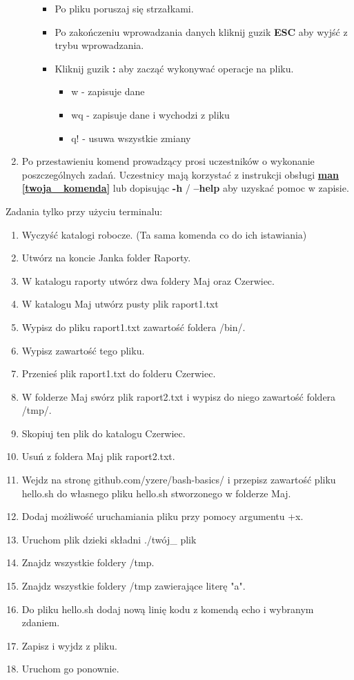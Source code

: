 \documentclass[10pt,a4paper]{article}
\begin{document}
\begin{enumerate}
\begin{itemize}
\begin{itemize}
\item Po pliku poruszaj się strzałkami.
\item Po zakończeniu wprowadzania danych kliknij guzik \textbf{ESC} aby wyjść z trybu wprowadzania.
\item Kliknij guzik \textbf{:} aby zacząć wykonywać operacje na pliku.
\begin{itemize}
\item w - zapisuje dane
\item wq - zapisuje dane i wychodzi z pliku
\item q! - usuwa wszystkie zmiany
\end{itemize}
\end{itemize}

\end{itemize}

\item Po przestawieniu komend prowadzący prosi uczestników o wykonanie poszczególnych zadań. Uczestnicy mają korzystać z instrukcji obsługi \textbf{\underline{man [twoja\_ komenda]}} lub dopisując \textbf{-h} / \textbf{--help} aby uzyskać pomoc w zapisie.\\ 
\end{enumerate}
Zadania tylko przy użyciu terminalu:
\begin{enumerate}
\item Wyczyść katalogi robocze. (Ta sama komenda co do ich istawiania)
\item Utwórz na koncie Janka folder Raporty.
\item W katalogu raporty utwórz dwa foldery Maj oraz Czerwiec.
\item W katalogu Maj utwórz pusty plik raport1.txt
\item Wypisz do pliku raport1.txt zawartość foldera /bin/.
\item Wypisz zawartość tego pliku.
\item Przenieś plik raport1.txt do folderu Czerwiec.
\item W folderze Maj swórz plik raport2.txt i wypisz do niego zawartość foldera /tmp/.
\item Skopiuj ten plik do katalogu Czerwiec.
\item Usuń z foldera Maj plik raport2.txt.
\item Wejdz na stronę github.com/yzere/bash-basics/ i przepisz zawartość pliku hello.sh do własnego pliku hello.sh stworzonego w folderze Maj.
\item Dodaj możliwość uruchamiania pliku przy pomocy argumentu +x.
\item Uruchom plik dzieki składni ./twój\_ plik
\item Znajdz wszystkie foldery /tmp.
\item Znajdz wszystkie foldery /tmp zawierające literę "a".
\item Do pliku hello.sh dodaj nową linię kodu z komendą echo i wybranym zdaniem.
\item Zapisz i wyjdz z pliku.
\item Uruchom go ponownie.
\end{enumerate}
\end{document}
